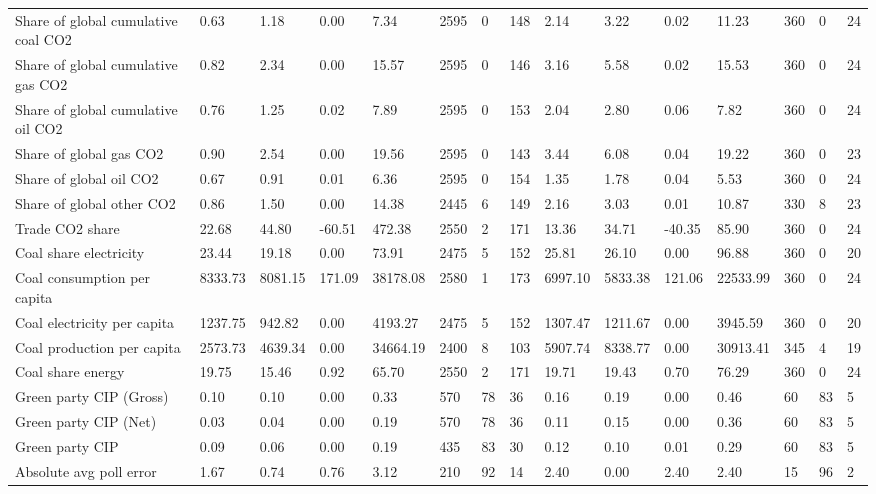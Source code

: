 \begin{longtable}{lllllllllllllll}
Share of global cumulative coal CO2 & 0.63 & 1.18 & 0.00 & 7.34 & 2595 & 0 & 148 & 2.14 & 3.22 & 0.02 & 11.23 & 360 & 0 & 24\\
Share of global cumulative gas CO2 & 0.82 & 2.34 & 0.00 & 15.57 & 2595 & 0 & 146 & 3.16 & 5.58 & 0.02 & 15.53 & 360 & 0 & 24\\
\addlinespace
Share of global cumulative oil CO2 & 0.76 & 1.25 & 0.02 & 7.89 & 2595 & 0 & 153 & 2.04 & 2.80 & 0.06 & 7.82 & 360 & 0 & 24\\
Share of global gas CO2 & 0.90 & 2.54 & 0.00 & 19.56 & 2595 & 0 & 143 & 3.44 & 6.08 & 0.04 & 19.22 & 360 & 0 & 23\\
Share of global oil CO2 & 0.67 & 0.91 & 0.01 & 6.36 & 2595 & 0 & 154 & 1.35 & 1.78 & 0.04 & 5.53 & 360 & 0 & 24\\
Share of global other CO2 & 0.86 & 1.50 & 0.00 & 14.38 & 2445 & 6 & 149 & 2.16 & 3.03 & 0.01 & 10.87 & 330 & 8 & 23\\
Trade CO2 share & 22.68 & 44.80 & -60.51 & 472.38 & 2550 & 2 & 171 & 13.36 & 34.71 & -40.35 & 85.90 & 360 & 0 & 24\\
\addlinespace
Coal share electricity & 23.44 & 19.18 & 0.00 & 73.91 & 2475 & 5 & 152 & 25.81 & 26.10 & 0.00 & 96.88 & 360 & 0 & 20\\
Coal consumption per capita & 8333.73 & 8081.15 & 171.09 & 38178.08 & 2580 & 1 & 173 & 6997.10 & 5833.38 & 121.06 & 22533.99 & 360 & 0 & 24\\
Coal electricity per capita & 1237.75 & 942.82 & 0.00 & 4193.27 & 2475 & 5 & 152 & 1307.47 & 1211.67 & 0.00 & 3945.59 & 360 & 0 & 20\\
Coal production per capita & 2573.73 & 4639.34 & 0.00 & 34664.19 & 2400 & 8 & 103 & 5907.74 & 8338.77 & 0.00 & 30913.41 & 345 & 4 & 19\\
Coal share energy & 19.75 & 15.46 & 0.92 & 65.70 & 2550 & 2 & 171 & 19.71 & 19.43 & 0.70 & 76.29 & 360 & 0 & 24\\
\addlinespace
Green party CIP (Gross) & 0.10 & 0.10 & 0.00 & 0.33 & 570 & 78 & 36 & 0.16 & 0.19 & 0.00 & 0.46 & 60 & 83 & 5\\
Green party CIP (Net) & 0.03 & 0.04 & 0.00 & 0.19 & 570 & 78 & 36 & 0.11 & 0.15 & 0.00 & 0.36 & 60 & 83 & 5\\
Green party CIP & 0.09 & 0.06 & 0.00 & 0.19 & 435 & 83 & 30 & 0.12 & 0.10 & 0.01 & 0.29 & 60 & 83 & 5\\
Absolute avg poll error & 1.67 & 0.74 & 0.76 & 3.12 & 210 & 92 & 14 & 2.40 & 0.00 & 2.40 & 2.40 & 15 & 96 & 2\\

\end{longtable}
